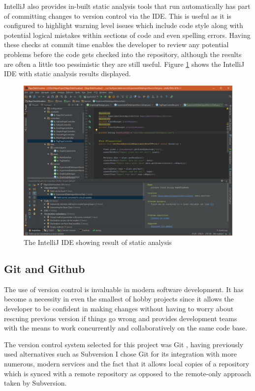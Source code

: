 IntelliJ also provides in-built static analysis tools that run automatically has part of committing changes to version control via the IDE. This is useful as it is configured to highlight warning level issues which include code style along with potential logical mistakes within sections of code and even spelling errors. Having these checks at commit time enables the developer to review any potential problems before the code gets checked into the repository, although the results are often a little too pessimistic they are still useful. Figure \ref{fig:intellij} shows the IntelliJ IDE with static analysis results displayed.

\begin{figure}[H]
    \centering
    \includegraphics[width=\textwidth]{images/tools/intellij}
    \caption{The IntelliJ IDE showing result of static analysis}
    \label{fig:intellij}
\end{figure}

\subsection{Git and Github} \label{gitsection}

The use of version control is invaluable in modern software development. It has become a necessity in even the smallest of hobby projects since it allows the developer to be confident in making changes without having to worry about rescuing previous version if things go wrong and provides development teams with the means to work concurrently and collaboratively on the same code base. 

The version control system selected for this project was Git \cite{_git}, having previously used alternatives such as Subversion I chose Git for its integration with more numerous, modern services and the fact that it allows local copies of a repository which is synced with a remote repository as opposed to the remote-only approach taken by Subversion.

